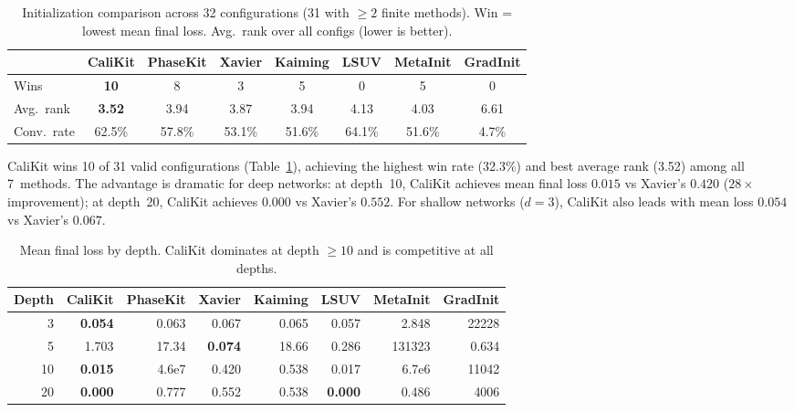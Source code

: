 \documentclass[10pt]{article}
\begin{document}
\begin{table}[t]
\centering
\caption{Initialization comparison across 32 configurations (31 with $\geq 2$ finite methods). Win = lowest mean final loss. Avg.\ rank over all configs (lower is better).}
\label{tab:baseline-wins}
\small
\begin{tabular}{@{}lccccccc@{}}
\toprule
& \textbf{CaliKit} & \textbf{PhaseKit} & \textbf{Xavier} & \textbf{Kaiming} & \textbf{LSUV} & \textbf{MetaInit} & \textbf{GradInit} \\
\midrule
Wins      & \textbf{10} & 8  & 3 & 5 & 0 & 5 & 0 \\
Avg.\ rank & \textbf{3.52} & 3.94 & 3.87 & 3.94 & 4.13 & 4.03 & 6.61 \\
Conv.\ rate & 62.5\% & 57.8\% & 53.1\% & 51.6\% & 64.1\% & 51.6\% & 4.7\% \\
\bottomrule
\end{tabular}
\end{table}

CaliKit wins 10 of 31 valid configurations (Table~\ref{tab:baseline-wins}), achieving the highest win rate (32.3\%) and best average rank (3.52) among all 7~methods.
The advantage is dramatic for deep networks: at depth~10, CaliKit achieves mean final loss $0.015$ vs Xavier's $0.420$ ($28\times$ improvement); at depth~20, CaliKit achieves $0.000$ vs Xavier's $0.552$.
For shallow networks ($d=3$), CaliKit also leads with mean loss $0.054$ vs Xavier's $0.067$.

\begin{table}[t]
\centering
\caption{Mean final loss by depth. CaliKit dominates at depth $\geq 10$ and is competitive at all depths.}
\label{tab:depth-results}
\small
\begin{tabular}{@{}rrrrrrrr@{}}
\toprule
\textbf{Depth} & \textbf{CaliKit} & \textbf{PhaseKit} & \textbf{Xavier} & \textbf{Kaiming} & \textbf{LSUV} & \textbf{MetaInit} & \textbf{GradInit} \\
\midrule
3  & \textbf{0.054} & 0.063 & 0.067 & 0.065 & 0.057 & 2.848 & 22228 \\
5  & 1.703 & 17.34 & \textbf{0.074} & 18.66 & 0.286 & 131323 & 0.634 \\
10 & \textbf{0.015} & 4.6e7 & 0.420 & 0.538 & 0.017 & 6.7e6 & 11042 \\
20 & \textbf{0.000} & 0.777 & 0.552 & 0.538 & \textbf{0.000} & 0.486 & 4006 \\
\bottomrule
\end{tabular}
\end{table}
\end{document}

